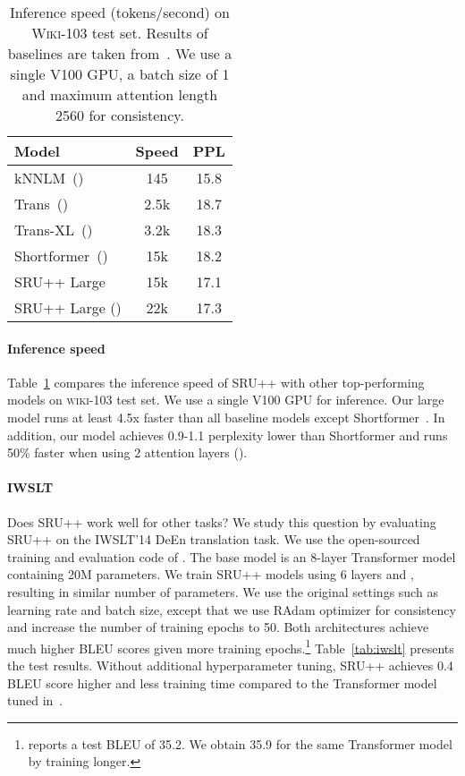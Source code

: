 \begin{table}[!t]
    \centering
    \begin{tabular}{lcc}
    \toprule
    \bf Model & \bf Speed & \bf PPL\\
    \hline
    kNNLM~(\citeauthor{Khandelwal2020Generalization}) & 145 & 15.8\\
    Trans~(\citeauthor{baevski2018adaptive}) & 2.5k & 18.7\\
    Trans-XL~(\citeauthor{dai-etal-2019-transformer}) & 3.2k & 18.3 \\
    Shortformer~(\citeauthor{press2020shortformer}) & 15k & 18.2\\
    \hline
    SRU++ Large & 15k & 17.1\\
    SRU++ Large () & 22k & 17.3\\
    \bottomrule
    \end{tabular}
    \caption{Inference speed (tokens/second) on \textsc{Wiki-103} test set. Results of baselines are taken from~\citet{press2020shortformer}. We use a single V100 GPU, a batch size of 1 and maximum attention length 2560 for consistency.}
    \label{tab:inference_speed}
\end{table}

\paragraph{Inference speed}
Table~\ref{tab:inference_speed} compares the inference speed of SRU++ with other top-performing models on \textsc{wiki-103} test set.
We use a single V100 GPU for inference.
Our large model runs at least 4.5x faster than all baseline models except Shortformer~\cite{press2020shortformer}.
In addition, our model achieves 0.9-1.1 perplexity lower than Shortformer and runs 50\% faster when using 2 attention layers ().


\paragraph{\textsc{IWSLT}}
Does SRU++ work well for other tasks?
We study this question by evaluating SRU++ on the \textsc{IWSLT}'14 DeEn translation task.
We use the open-sourced training and evaluation code of \citet{lin-etal-2020-autoregressive}.
The base model is an 8-layer Transformer model containing 20M parameters.
We train SRU++ models using 6 layers and , resulting in similar number of parameters.
We use the original settings such as learning rate and batch size, except that we use RAdam optimizer for consistency and increase the number of training epochs to 50.
Both architectures achieve much higher BLEU scores given more training epochs.\footnote{\citet{lin-etal-2020-autoregressive} reports a test BLEU of 35.2. We obtain 35.9 for the same Transformer model by training longer.}
Table~\ref{tab:iwslt} presents the test results.
Without additional hyperparameter tuning, SRU++ achieves 0.4 BLEU score higher and less training time compared to the Transformer model tuned in~\citet{lin-etal-2020-autoregressive}.

